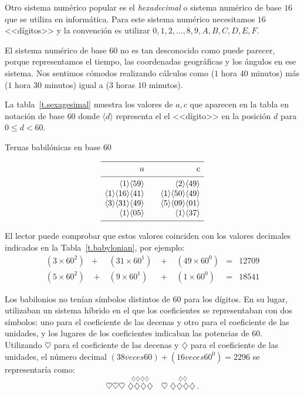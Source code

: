Otro sistema numérico popular es el \emph{hexadecimal} o sistema numérico de base $16$ que se utiliza en informática. Para este sistema numérico necesitamos $16$ <<dígitos>> y la convención es utilizar $0,1,2,\ldots,8,9,A,B,C,D,E,F$.

El sistema numérico de base $60$ no es tan desconocido como puede parecer, porque representamos el tiempo, las coordenadas geográficas y los ángulos en ese sistema. Nos sentimos cómodos realizando cálculos como ($1$ hora $40$ minutos) más ($1$ hora $30$ minutos) igual a ($3$ horas $10$ minutos).

La tabla~\ref{t.sexagesimal} muestra los valores de $a,c$ que aparecen en la tabla en notación de base $60$ donde $\langle d\rangle$ representa el el <<dígito>> en la posición $d$ para $0\leq d<60$.
\begin{table}[t]
\caption{Ternas babilónicas en base $60$}\label{t.sexagesimal}
\[
\begin{array}{r@{$\quad\quad$}r}
\hline
\noalign{\smallskip}
a&c\\
\noalign{\smallskip}\hline\noalign{\smallskip}
\langle 1\rangle \langle 59 \rangle&\langle 2\rangle \langle 49 \rangle\\
\langle 1\rangle \langle 16 \rangle\langle 41\rangle&\langle 1\rangle \langle 50 \rangle\langle 49\rangle\\
\langle 3\rangle \langle 31 \rangle\langle 49\rangle&\langle 5\rangle \langle 09 \rangle\langle 01\rangle\\
\langle 1\rangle \langle 05 \rangle&\langle 1\rangle \langle 37 \rangle\\
\noalign{\smallskip}\hline
\end{array}
\]
\end{table}
El lector puede comprobar que estos valores coinciden con los valores decimales indicados en la Tabla~\ref{t.babylonian}, por ejemplo:
\[
\renewcommand{\arraystretch}{1.3}
\begin{array}{lclclcr}
(3\times 60^2) &+& (31\times 60^1) &\;+\;& (49\times 60^0) &=&   12709\\
(5\times 60^2) &\;+\;& (9\times 60^1) &\;+\;& (1\times 60^0) &=& 18541
\end{array}
\]

Los babilonios no tenían símbolos distintos de $60$ para los dígitos. En su lugar, utilizaban un sistema híbrido en el que los coeficientes se representaban con dos símbolos: uno para el coeficiente de las decenas y otro para el coeficiente de las unidades, y los lugares de los coeficientes indicaban las potencias de $60$. Utilizando $\heartsuit$ para el coeficiente de las decenas y $\diamondsuit$ para el coeficiente de las unidades, el número decimal $(38 veces 60)+(16 veces 60^0)=2296$ se representaría como:
\[
\heartsuit\heartsuit\heartsuit \; \stackrel{\displaystyle\diamondsuit\diamondsuit\diamondsuit\diamondsuit}{\diamondsuit\diamondsuit\diamondsuit\diamondsuit}
\quad
\heartsuit \; \stackrel{\displaystyle\diamondsuit\diamondsuit}{\diamondsuit\diamondsuit\diamondsuit\diamondsuit}\,.
\]

